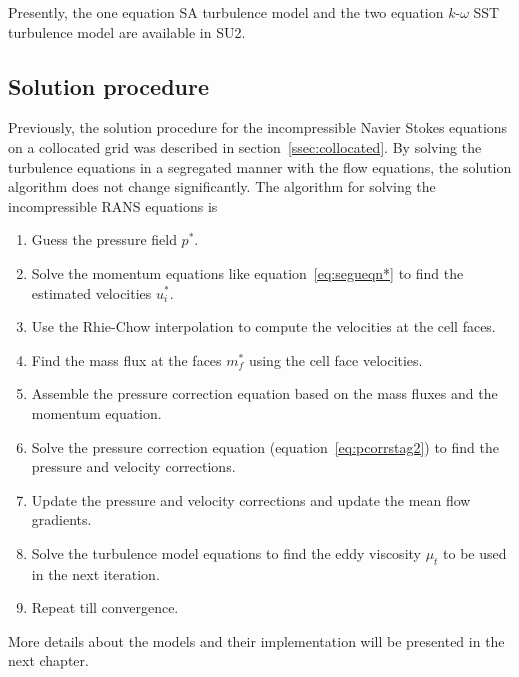 Presently, the one equation SA turbulence model and the two equation $k$-$\omega$ SST turbulence model are available in SU2. 

\subsection{Solution procedure}
Previously, the solution procedure for the incompressible Navier Stokes equations on a collocated grid was described in section~\ref{ssec:collocated}. By solving the turbulence equations in a segregated manner with the flow equations, the solution algorithm does not change significantly. The algorithm for solving the incompressible RANS equations is 
\begin{enumerate}
    \item Guess the pressure field $p^{\ast}$.
    \item Solve the momentum equations like equation~\ref{eq:segueqn*} to find the estimated velocities $u_i^{\ast}$.
    \item Use the Rhie-Chow interpolation to compute the velocities at the cell faces.
    \item Find the mass flux at the faces $m_f^{\ast}$ using the cell face velocities.
    \item Assemble the pressure correction equation based on the mass fluxes and the momentum equation.
    \item Solve the pressure correction equation (equation~\ref{eq:pcorrstag2}) to find the pressure and velocity corrections.
    \item Update the pressure and velocity corrections and update the mean flow gradients.
    \item Solve the turbulence model equations to find the eddy viscosity $\mu_t$ to be used in the next iteration.
    \item Repeat till convergence.
\end{enumerate}

More details about the models and their implementation will be presented in the next chapter.



